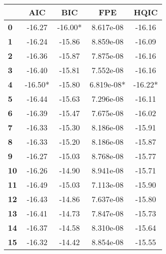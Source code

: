 \begin{center}
\begin{tabular}{lcccc}
\toprule
            & \textbf{AIC} & \textbf{BIC} & \textbf{FPE} & \textbf{HQIC}  \\
\midrule
\textbf{0}  &      -16.27  &     -16.00*  &   8.617e-08  &       -16.16   \\
\textbf{1}  &      -16.24  &      -15.86  &   8.859e-08  &       -16.09   \\
\textbf{2}  &      -16.36  &      -15.87  &   7.875e-08  &       -16.16   \\
\textbf{3}  &      -16.40  &      -15.81  &   7.552e-08  &       -16.16   \\
\textbf{4}  &     -16.50*  &      -15.80  &  6.819e-08*  &      -16.22*   \\
\textbf{5}  &      -16.44  &      -15.63  &   7.296e-08  &       -16.11   \\
\textbf{6}  &      -16.39  &      -15.47  &   7.675e-08  &       -16.02   \\
\textbf{7}  &      -16.33  &      -15.30  &   8.186e-08  &       -15.91   \\
\textbf{8}  &      -16.33  &      -15.20  &   8.186e-08  &       -15.87   \\
\textbf{9}  &      -16.27  &      -15.03  &   8.768e-08  &       -15.77   \\
\textbf{10} &      -16.26  &      -14.90  &   8.941e-08  &       -15.71   \\
\textbf{11} &      -16.49  &      -15.03  &   7.113e-08  &       -15.90   \\
\textbf{12} &      -16.43  &      -14.86  &   7.637e-08  &       -15.80   \\
\textbf{13} &      -16.41  &      -14.73  &   7.847e-08  &       -15.73   \\
\textbf{14} &      -16.37  &      -14.58  &   8.310e-08  &       -15.64   \\
\textbf{15} &      -16.32  &      -14.42  &   8.854e-08  &       -15.55   \\
\bottomrule
\end{tabular}
\end{center}